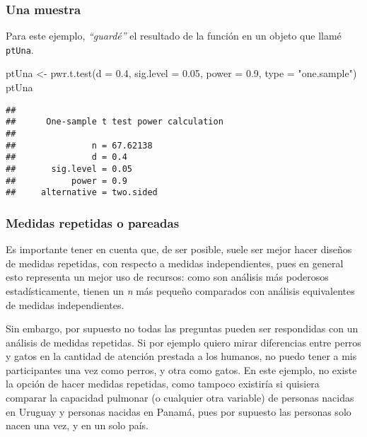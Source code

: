 \documentclass[
]{article}
\newenvironment{Shaded}{\begin{snugshade}}{\end{snugshade}}
\newcommand{\AttributeTok}[1]{\textcolor[rgb]{0.16,0.50,0.73}{#1}}
\newcommand{\FloatTok}[1]{\textcolor[rgb]{0.96,0.45,0.00}{#1}}
\newcommand{\FunctionTok}[1]{\textcolor[rgb]{0.56,0.27,0.68}{#1}}
\newcommand{\NormalTok}[1]{\textcolor[rgb]{0.81,0.81,0.76}{#1}}
\newcommand{\OtherTok}[1]{\textcolor[rgb]{0.15,0.68,0.38}{#1}}
\newcommand{\StringTok}[1]{\textcolor[rgb]{0.96,0.31,0.31}{#1}}
\begin{document}
\hypertarget{una-muestra}{%
\subsubsection{Una muestra}\label{una-muestra}}

Para este ejemplo, \emph{``guardé''} el resultado de la función en un
objeto que llamé \texttt{ptUna}.

\begin{Shaded}
\begin{Highlighting}[]
\NormalTok{ptUna }\OtherTok{\textless{}{-}} \FunctionTok{pwr.t.test}\NormalTok{(}\AttributeTok{d =} \FloatTok{0.4}\NormalTok{, }\AttributeTok{sig.level =} \FloatTok{0.05}\NormalTok{,}
                    \AttributeTok{power =} \FloatTok{0.9}\NormalTok{,}
                    \AttributeTok{type =} \StringTok{"one.sample"}\NormalTok{)}
\NormalTok{ptUna}
\end{Highlighting}
\end{Shaded}

\begin{verbatim}
## 
##      One-sample t test power calculation 
## 
##               n = 67.62138
##               d = 0.4
##       sig.level = 0.05
##           power = 0.9
##     alternative = two.sided
\end{verbatim}

\hypertarget{TRep}{%
\subsubsection{Medidas repetidas o pareadas}\label{TRep}}

Es importante tener en cuenta que, de ser posible, suele ser mejor hacer
diseños de medidas repetidas, con respecto a medidas independientes,
pues en general esto representa un mejor uso de recursos: como son
análisis más poderosos estadísticamente, tienen un \emph{n} más pequeño
comparados con análisis equivalentes de medidas independientes.

Sin embargo, por supuesto no todas las preguntas pueden ser respondidas
con un análisis de medidas repetidas. Si por ejemplo quiero mirar
diferencias entre perros y gatos en la cantidad de atención prestada a
los humanos, no puedo tener a mis participantes una vez como perros, y
otra como gatos. En este ejemplo, no existe la opción de hacer medidas
repetidas, como tampoco existiría si quisiera comparar la capacidad
pulmonar (o cualquier otra variable) de personas nacidas en Uruguay y
personas nacidas en Panamá, pues por supuesto las personas solo nacen
una vez, y en un solo país.
\end{document}
